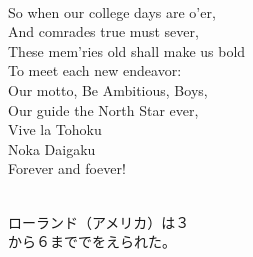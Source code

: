 \documentclass[10pt,b5j]{tarticle} %
\begin{document}
\begin{enumerate}
\begin{minipage}[c]{\blocksize}
        \vspace{\linespace}
        \item~\\
        So when our college days are o'er,\\
          And comrades true must sever,\\
        These mem'ries old shall make us bold\\
          To meet each new endeavor:\\
        Our motto, Be Ambitious, Boys,\\
          Our guide the North Star ever,\\
            Vive la Tohoku\\
            Noka Daigaku\\
        Forever and foever!
        
        
    \end{minipage}
    \begin{minipage}[c]{\blocksize}
        
        \vspace{\linespace}
        \item~\\
        ローランド（アメリカ）は３\\
        から６まででをえられた。
    
    \end{minipage}
\end{enumerate} %
\end{document}
